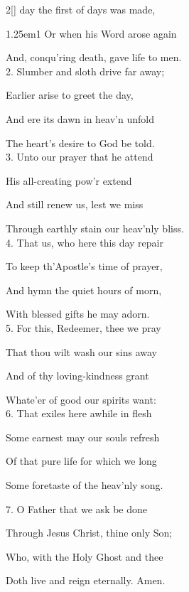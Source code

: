 \begin{paracol}{2}[]
 day the first of days was made,


\begin{hangparas}{1.25em}{1}
Or when his Word arose again

And, conqu'ring death, gave life to men.\\

2. Slumber and sloth drive far away;

Earlier arise to greet the day,

And ere its dawn in heav'n unfold

The heart's desire to God be told.\\

3. Unto our prayer that he attend 

His all-creating pow'r extend

And still renew us, lest we miss

Through earthly stain our heav'nly bliss.\\

4. That us, who here this day repair

To keep th'Apostle's time of prayer,

And hymn the quiet hours of morn,

With blessed gifts he may adorn.\\

5. For this, Redeemer, thee we pray

That thou wilt wash our sins away

And of thy loving-kindness grant

Whate'er of good our spirits want:\\

6. That exiles here awhile in flesh

Some earnest may our souls refresh 

Of that pure life for which we long

Some foretaste of the heav'nly song.%

7. O Father that we ask be done

Through Jesus Christ, thine only Son;

Who, with the Holy Ghost and thee

Doth live and reign eternally. Amen.
\end{hangparas}

\fussy
\end{paracol}

